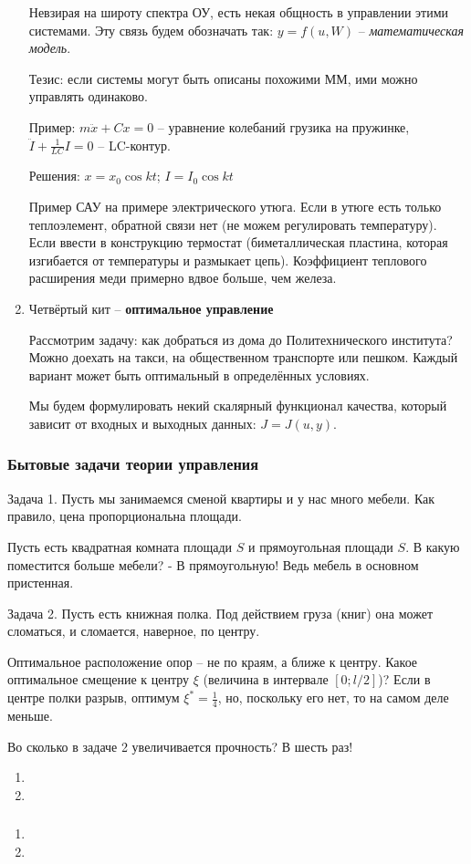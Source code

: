 \documentclass[main.tex]{subfiles}
\begin{document}
\begin{enumerate}
	Невзирая на широту спектра ОУ, есть некая общность в управлении этими системами. Эту связь будем обозначать так: $ y = f(u, W) $ -- \emph{математическая модель}.
	
	Тезис: если системы могут быть описаны похожими ММ, ими можно управлять одинаково.
	
	Пример: $ m\ddot{x} + Cx = 0 $ -- уравнение колебаний грузика на пружинке, $ \ddot I + \frac{1}{LC}I = 0 $ -- LC-контур.
	
	Решения: $ x = x_0 \cos kt $; $ I = I_0 \cos kt $
	
	\hlinefill
	
	Пример САУ на примере электрического утюга. Если в утюге есть только теплоэлемент, обратной связи нет (не можем регулировать температуру).
	Если ввести в конструкцию термостат (биметаллическая пластина, которая изгибается от температуры и размыкает цепь). Коэффициент теплового расширения меди примерно вдвое больше, чем железа. 
	
	\item Четвёртый кит -- \textbf{оптимальное управление}
	
	Рассмотрим задачу: как добраться из дома до Политехнического института?
	Можно доехать на такси, на общественном транспорте или пешком.
	Каждый вариант может быть оптимальный в определённых условиях.
	
	Мы будем формулировать некий скалярный функционал качества, который зависит от входных и выходных данных: $ J = J(u, y) $.
	
\end{enumerate}

\subsubsection{Бытовые задачи теории управления}

Задача 1. Пусть мы занимаемся сменой квартиры и у нас много мебели. Как правило, цена пропорциональна площади.

Пусть есть квадратная комната площади $ S $ и прямоугольная площади $ S $.
В какую поместится больше мебели? - В прямоугольную! Ведь мебель в основном пристенная.

Задача 2. Пусть есть книжная полка. Под действием груза (книг) она может сломаться, и сломается, наверное, по центру.

Оптимальное расположение опор -- не по краям, а ближе к центру. Какое оптимальное смещение к центру $ \xi $ (величина в интервале $ [0; l/2] $)? Если в центре полки разрыв, оптимум $ \xi^* = \frac{1}{4} $, но, поскольку его нет, то на самом деле меньше.

Во сколько в задаче 2 увеличивается прочность? В шесть раз! 

\begin{enumerate}[noitemsep]
	\item
	\item
\end{enumerate}

\subsubsection{}

\begin{enumerate}[noitemsep]
	\item
	\item
\end{enumerate}
\end{document}
